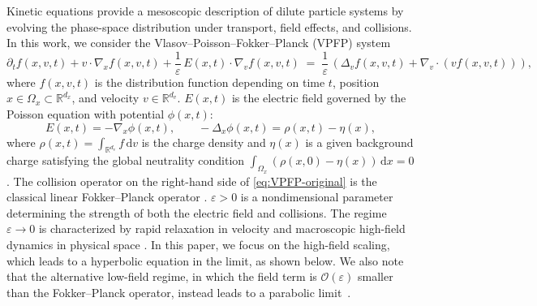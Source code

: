 \documentclass[]{article}
\numberwithin{equation}{section}
\newcommand{\dv}{\mathrm{d}v}
\newcommand{\dx}{\mathrm{d}x}
\newcommand{\modifyfirst}[1]{#1}
\begin{document}
Kinetic equations provide a mesoscopic  description of dilute particle systems by evolving the phase-space distribution under transport, field effects, and collisions. In this work, we consider the Vlasov--Poisson--Fokker--Planck (VPFP) system
\begin{equation}\label{eq:VPFP-original}
  \partial_t f(x,v,t) + v\cdot\nabla_x f(x,v,t) + \frac{1}{\varepsilon}\,E(x,t)\cdot\nabla_v f(x,v,t)
  \;=\; \frac{1}{\varepsilon}\,\left(\Delta_v f(x,v,t) + \nabla_v \cdot (v f(x,v,t))\right),
\end{equation}
where $f(x,v,t)$ is the distribution function depending on time $t$, position \(x\in\Omega_x\subset\mathbb{R}^{d_x}\), and velocity \(v\in\mathbb{R}^{d_v}\). $E(x,t)$ is the electric field governed by the Poisson equation with potential \(\phi(x,t)\):
\begin{equation}\label{eq:Poisson}
  E(x,t) = -\nabla_x\phi(x,t),\qquad -\Delta_x\phi(x,t)=\rho(x,t)-\eta(x),
\end{equation}
where \(\rho(x,t)=\int_{\mathbb{R}^{d_v}}f\,\dv\) is the charge density and $\eta(x)$ is a given background charge satisfying the global neutrality condition \(\int_{\Omega_x}(\rho(x,0)-\eta(x))\,\dx=0\). The collision operator on the right-hand side of \eqref{eq:VPFP-original} is the classical linear Fokker--Planck operator \cite{dougherty1964model, villani2002review}. \(\varepsilon>0\) is a nondimensional parameter determining the strength of both the electric field and collisions. \modifyfirst{The regime \(\varepsilon\to 0\) is characterized by rapid relaxation in velocity and macroscopic high-field dynamics in physical space \cite{nieto2001high,poupaud1992runaway, cercignani2000device}. In this paper, we focus on the high-field scaling, which leads to a hyperbolic equation in the limit, as shown below. We also note that the alternative low-field regime, in which the field term is $\mathcal{O}(\varepsilon)$ smaller than the Fokker--Planck operator, instead leads to a parabolic limit~\cite{poupaud2000parabolic, arnold2001low}.} 
\end{document}
